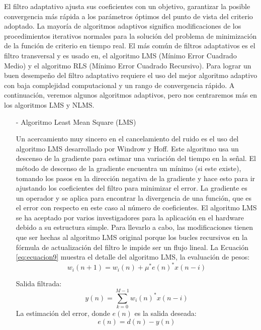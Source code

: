 \begin{enumerate}
\begin{enumerate}
El filtro adaptativo ajusta sus coeficientes con un objetivo, garantizar la posible convergencia más rápida a los parámetros óptimos del punto de vista del criterio adoptado. La mayoría de algoritmos adaptivos significa modificaciones de los procedimientos iterativos normales para la solución del problema de minimización de la función de criterio en tiempo real. El más común de filtros adaptativos es el filtro transversal y es usado en, el algoritmo LMS (Mínimo Error Cuadrado Medio) y el algoritmo RLS (Mínimo Error Cuadrado Recursivo). Para lograr un buen desempeño del filtro adaptativo requiere el uso del mejor algoritmo adaptivo con baja complejidad computacional y un rango de convergencia rápido. A continuación, veremos algunos algoritmos adaptivos, pero nos centraremos más en los algoritmos LMS y NLMS.

\begin{enumerate}
\item[-]Algoritmo Least Mean Square (LMS)
\par
Un acercamiento muy sincero en el cancelamiento del ruido es el uso del algoritmo LMS desarrollado por Windrow y Hoff. Este algoritmo usa un descenso de la gradiente para estimar una variación del tiempo en la señal. El método de descenso de la gradiente encuentra un mínimo (si este existe), tomando los pasos en la dirección negativa de la gradiente y hace esto para ir ajustando los coeficientes del filtro para minimizar el error. La gradiente es un operador y se aplica para encontrar la divergencia de una función, que es el error con respecto en este caso al número de coeficientes. 
\vskip 0.5cm
El algoritmo LMS se ha aceptado por varios investigadores para la aplicación en el hardware debido a su estructura simple. Para llevarlo a cabo, las modificaciones tienen que ser hechas al algoritmo LMS original porque los bucles recursivos en la fórmula de actualización del filtro le impide ser un flujo lineal.
\vskip 0.5cm
La Ecuación \ref{eq:ecuacion9} muestra el detalle del algoritmo LMS, la evaluación de pesos:
\begin{equation}
\label{eq:ecuacion9}
w_{i}(n+1) = w_{i}(n) + \mu^{*}e(n)^{*}x(n-i)
\end{equation}

Salida filtrada:
\vskip -0.5cm
\begin{equation}
\label{eq:ecuacion10}
y(n) = \sum_{k=0}^{M-1}w_{i}(n)^{*}x(n-i)
\end{equation}
\vskip 0.5cm
La estimación del error, donde $e(n)$ es la salida deseada:
\vskip -1cm
\begin{equation}
\label{eq:ecuacion11}
e(n) = d(n) - y(n)
\end{equation}


\end{enumerate}
\end{enumerate}
\end{enumerate}
